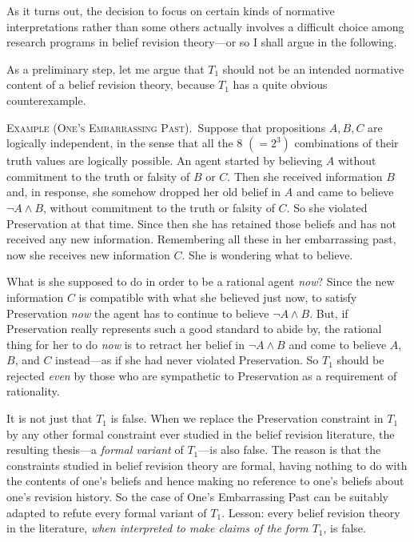 As it turns out, the decision to focus on certain kinds of normative interpretations rather than some others actually involves a difficult choice among research programs in belief revision theory---or so I shall argue in the following. 

As a preliminary step, let me argue that $T_1$ should not be an intended normative content of a belief revision theory, because $T_1$ has a quite obvious counterexample. \op

	\xm \textsc{Example (One's Embarrassing Past).}\, Suppose that propositions $A, B, C$ are logically independent, in the sense that all the $8$ $(= 2^3)$ combinations of their truth values are logically possible. An agent started by believing $A$ without commitment to the truth or falsity of $B$ or $C$. Then she received information $B$ and, in response, she somehow dropped her old belief in $A$ and came to believe $\neg A \wedge B$, without commitment to the truth or falsity of $C$. So she violated Preservation at that time. Since then she has retained those beliefs and has not received any new information. Remembering all these in her embarrassing past, now she receives new information $C$. She is wondering what to believe.

\ed What is she supposed to do in order to be a rational agent {\em now}? Since the new information $C$ is compatible with what she believed just now, to satisfy Preservation {\em now} the agent has to continue to believe $\neg A \wedge B$. But, if Preservation really represents such a good standard to abide by, the rational thing for her to do {\em now} is to retract her belief in $\neg A \wedge B$ and come to believe $A$, $B$, and $C$ instead---as if she had never violated Preservation. So $T_1$ should be rejected {\em even} by those who are sympathetic to Preservation as a requirement of rationality. 

It is not just that $T_1$ is false. When we replace the Preservation constraint in $T_1$ by any other formal constraint ever studied in the belief revision literature, the resulting thesis---a {\em formal variant} of $T_1$---is also false. The reason is that the constraints studied in belief revision theory are formal, having nothing to do with the contents of one's beliefs and hence making no reference to one's beliefs about one's revision history. So the case of One's Embarrassing Past can be suitably adapted to refute every formal variant of $T_1$. Lesson: every belief revision theory in the literature, {\em when interpreted to make claims of the form $T_1$}, is false. 

